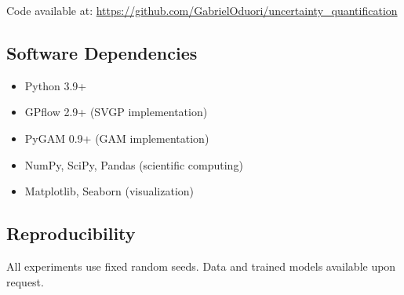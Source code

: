 \documentclass[11pt,letterpaper]{article}
\begin{document}
Code available at: \url{https://github.com/GabrielOduori/uncertainty_quantification}

\subsection{Software Dependencies}
\begin{itemize}
    \item Python 3.9+
    \item GPflow 2.9+ (SVGP implementation)
    \item PyGAM 0.9+ (GAM implementation)
    \item NumPy, SciPy, Pandas (scientific computing)
    \item Matplotlib, Seaborn (visualization)
\end{itemize}

\subsection{Reproducibility}
All experiments use fixed random seeds. Data and trained models available upon request.
\end{document}
